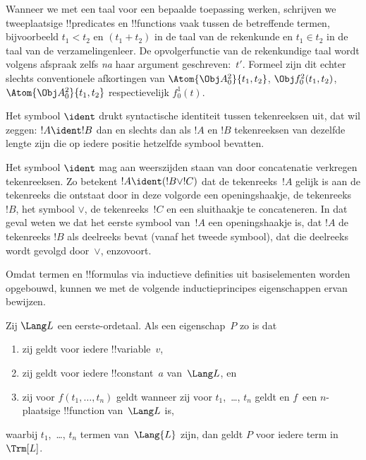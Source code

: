 \documentclass[../../../include/open-logic-section]{subfiles}
\begin{document}
Wanneer we met een taal voor een bepaalde toepassing werken, schrijven
we tweeplaatsige !!{predicate}s en !!{function}s vaak tussen de
betreffende termen, bijvoorbeeld $t_1 < t_2$ en $(t_1 + t_2)$ in de
taal van de rekenkunde en $t_1 \in t_2$ in de taal van de
verzamelingenleer. De opvolgerfunctie van de rekenkundige taal wordt
volgens afspraak zelfs \emph{na} haar argument geschreven:~$t'$.
Formeel zijn dit echter slechts conventionele afkortingen van
$\Atom{\Obj A^2_0}{t_1, t_2}$, $\Obj f^2_0(t_1, t_2)$,
$\Atom{\Obj A^2_0}{t_1, t_2}$ respectievelijk $f^1_0(t)$.

\begin{defn}
Het symbool $\ident$ drukt syntactische identiteit tussen tekenreeksen
uit, dat wil zeggen: $!A \ident !B$ dan en slechts dan als $!A$ en $!B$
tekenreeksen van dezelfde lengte zijn die op iedere positie hetzelfde
symbool bevatten.
\end{defn}

Het symbool $\ident$ mag aan weerszijden staan van door concatenatie
verkregen tekenreeksen. Zo betekent $!A \ident (!B \lor !C)$ dat de
tekenreeks~$!A$ gelijk is aan de tekenreeks die ontstaat door in deze
volgorde een openingshaakje, de tekenreeks $!B$, het symbool $\lor$, de
tekenreeks~$!C$ en een sluithaakje te concateneren. In dat geval weten
we dat het eerste symbool van~$!A$ een openingshaakje is, dat $!A$ de
tekenreeks $!B$ als deelreeks bevat (vanaf het tweede symbool), dat die
deelreeks wordt gevolgd door~$\lor$, enzovoort.

Omdat termen en !!{formula}s via inductieve definities uit basiselementen
worden opgebouwd, kunnen we met de volgende inductieprincipes
eigenschappen ervan bewijzen.

\begin{lem}
    Zij $\Lang L$ een eerste-ordetaal.
    Als een eigenschap~$P$ zo is dat
    \begin{enumerate}
        \item zij geldt voor iedere !!{variable}~$v$,
        \item zij geldt voor iedere !!{constant}~$a$ van~$\Lang L$, en
        \item zij voor $f(t_1,\dotsc,t_n)$ geldt wanneer zij voor
        $t_1$,~\dots, $t_n$ geldt en $f$~een $n$-plaatsige
            !!{function} van~$\Lang L$ is,
    \end{enumerate}
    waarbij $t_1$,~\dots, $t_n$ termen van~$\Lang{L}$ zijn, dan geldt
    $P$ voor iedere term in~$\Trm[L]$.
\end{lem}
\end{document}
